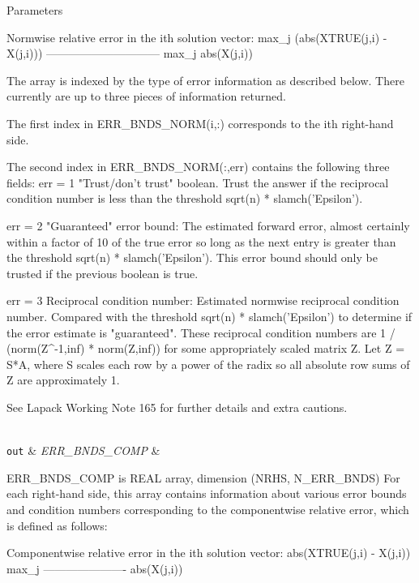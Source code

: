 \begin{DoxyParams}[1]{Parameters}
\begin{DoxyVerb}
     Normwise relative error in the ith solution vector:
             max_j (abs(XTRUE(j,i) - X(j,i)))
            ------------------------------
                  max_j abs(X(j,i))

     The array is indexed by the type of error information as described
     below. There currently are up to three pieces of information
     returned.

     The first index in ERR_BNDS_NORM(i,:) corresponds to the ith
     right-hand side.

     The second index in ERR_BNDS_NORM(:,err) contains the following
     three fields:
     err = 1 "Trust/don't trust" boolean. Trust the answer if the
              reciprocal condition number is less than the threshold
              sqrt(n) * slamch('Epsilon').

     err = 2 "Guaranteed" error bound: The estimated forward error,
              almost certainly within a factor of 10 of the true error
              so long as the next entry is greater than the threshold
              sqrt(n) * slamch('Epsilon'). This error bound should only
              be trusted if the previous boolean is true.

     err = 3  Reciprocal condition number: Estimated normwise
              reciprocal condition number.  Compared with the threshold
              sqrt(n) * slamch('Epsilon') to determine if the error
              estimate is "guaranteed". These reciprocal condition
              numbers are 1 / (norm(Z^{-1},inf) * norm(Z,inf)) for some
              appropriately scaled matrix Z.
              Let Z = S*A, where S scales each row by a power of the
              radix so all absolute row sums of Z are approximately 1.

     See Lapack Working Note 165 for further details and extra
     cautions.\end{DoxyVerb}
\\
\hline
\mbox{\tt out}  & {\em E\+R\+R\+\_\+\+B\+N\+D\+S\+\_\+\+C\+O\+M\+P} & \begin{DoxyVerb}          ERR_BNDS_COMP is REAL array, dimension (NRHS, N_ERR_BNDS)
     For each right-hand side, this array contains information about
     various error bounds and condition numbers corresponding to the
     componentwise relative error, which is defined as follows:

     Componentwise relative error in the ith solution vector:
                    abs(XTRUE(j,i) - X(j,i))
             max_j ----------------------
                         abs(X(j,i))


\end{DoxyVerb}
\end{DoxyParams}

